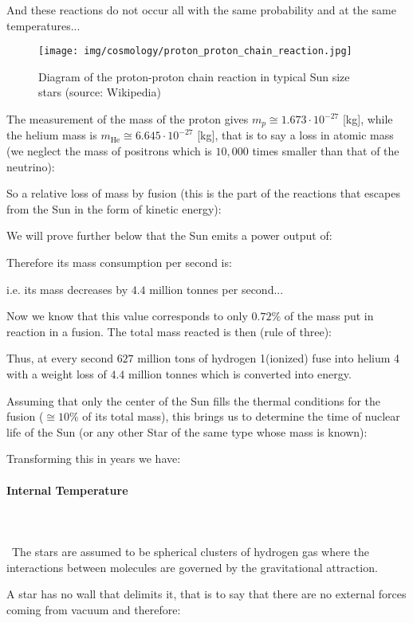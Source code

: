 	And these reactions do not occur all with the same probability and at the same temperatures...
	\begin{figure}[H]
		\centering
		\texttt{[image: img/cosmology/proton\_proton\_chain\_reaction.jpg]}	
		\caption[Diagram of the proton-proton chain reaction in typical Sun size stars]{Diagram of the proton-proton chain reaction in typical Sun size stars (source: Wikipedia)}
	\end{figure}
	The measurement of the mass of the proton gives $m_p\cong 1.673\cdot 10^{-27}$ [kg], while the helium mass is   $m_{\text{He}}\cong 6.645\cdot 10^{-27}$ [kg], that is to say a loss in atomic mass (we neglect the mass of positrons which is $10,000$ times smaller than that of the neutrino):
	
	So a relative loss of mass by fusion (this is the part of the reactions that escapes from the Sun in the form of kinetic energy):
	
	We will prove further below that the Sun emits a power output of:
	
	Therefore its mass consumption per second is:
	
	i.e. its mass decreases by $4.4$ million tonnes per second...
	
	Now we know that this value corresponds to only $0.72\%$ of the mass put in reaction in a fusion. The total mass reacted  is then (rule of three):
	
	Thus, at every second $627$ million tons of hydrogen 1(ionized) fuse into helium 4 with a weight loss of $4.4$ million tonnes which is converted into energy.
	
	Assuming that only the center of the Sun fills the thermal conditions for the fusion ($\cong 10\%$ of its total mass), this brings us to determine the time of nuclear life of the Sun (or any other Star of the same type whose mass is known):
	
	Transforming this in years we have:
	
	
	\paragraph{Internal Temperature}\mbox{}\\\\\
	The stars are assumed to be spherical clusters of hydrogen gas where the interactions between molecules are governed by the gravitational attraction.

	A star has no wall that delimits it, that is to say that there are no external forces coming from vacuum and therefore:
	
